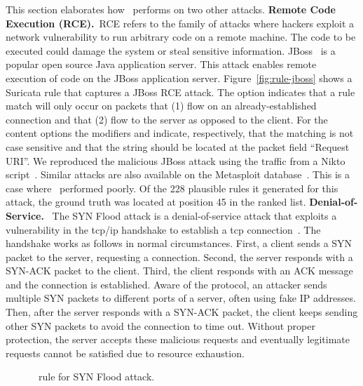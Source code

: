 \documentclass[conference]{IEEEtran}
\begin{document}
This section elaborates how \tname\ performs on two other attacks.
\textbf{Remote Code Execution (RCE).}~RCE refers to the family of
attacks where hackers exploit a network vulnerability to run arbitrary
code on a remote machine. The code to be executed could damage the
system or steal sensitive information. JBoss~\cite{jboss} is a popular
open source Java application server. This attack enables remote
execution of code on the JBoss application server.
Figure~\ref{fig:rule-jboss} shows a Suricata rule that captures a
JBoss RCE attack.  The option 
indicates that a rule match will only occur on packets that (1) flow
on an already-established connection and that (2) flow to the server
as opposed to the client. For the content options the modifiers
 and  indicate, respectively, that
the matching is not case sensitive and that the string should be
located at the packet field ``Request URI''. We reproduced the
malicious JBoss attack using the traffic from a Nikto
script~\cite{nikto}. Similar attacks are also available on the
Metasploit database~\cite{metasploit}. This is a case where
\tname\ performed poorly. Of the 228 plausible rules it generated for
this attack, the ground truth was located at position 45 in the ranked
list. \textbf{Denial-of-Service.}~
The SYN Flood attack is a denial-of-service attack that exploits a
vulnerability in the tcp/ip handshake
to establish a tcp connection~\cite{cloudfare-synflood}. The handshake
works as follows in normal circumstances. First, a client sends a SYN
packet to the server, requesting a connection. Second, the server
responds with a SYN-ACK packet to the client. Third, the client
responds with an ACK message and the connection is established. Aware
of the protocol, an attacker sends multiple SYN packets to different
ports of a server, often using fake IP addresses. Then, after the
server responds with a SYN-ACK packet, the client keeps sending other
SYN packets to avoid the connection to time out. Without proper
protection, the server accepts these malicious requests and eventually
legitimate requests cannot be satisfied due to resource exhaustion.

\begin{figure}[h!]
  
  \caption{\suri\ rule for SYN Flood attack.}
  \label{fig:synflood-example}
\end{figure}
\end{document}
